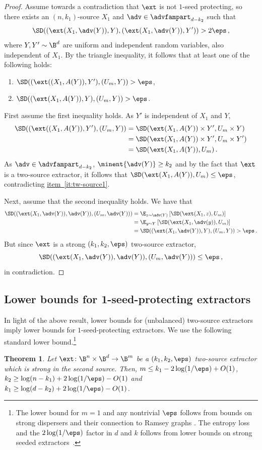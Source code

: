 \documentclass[11pt]{article}
\numberwithin{equation}{section}
\newtheorem{theorem}{Theorem}[section]
\theoremstyle{definition}
\theoremstyle{plain}
\newcommand{\expeqref}[2]{\hyperref[#2]{#1~\eqref{#2}}}
\begin{document}
\begin{proof}
Assume towards a contradiction that $\ext$ is not $1$-seed protecting,
so there exists an $(n,k_1)$-source $X_1$ and $\adv \in \advfampart_{d-k_2}$
such that
	\[
	\SD((\ext(X_1,\adv(Y)), Y), (\ext(X_1,\adv(Y)), Y')) > 2\eps\,,
	\]
where $Y, Y' \sim \B^d$ are uniform and independent random variables, also
independent of $X_1$.
	By the triangle inequality, it follows that at least one of the following holds:
\begin{enumerate}
\item\label{it:tw-source1} $\SD((\ext((X_1,A(Y)), Y'), (U_{m}, Y)) > \eps$,
\item $\SD((\ext(X_1,A(Y)), Y), (U_{m}, Y)) > \eps$.
\end{enumerate}	
First assume the first inequality holds. As $Y'$ is independent of $X_1$ and $Y$,
\begin{align*}
\SD((\ext((X_1,A(Y)), Y'), (U_{m}, Y)) &= 
\SD(\ext(X_1,A(Y)) \times Y', U_m \times Y) \\
&= \SD(\ext(X_1,A(Y)) \times Y', U_m \times Y') \\ &= \SD(\ext(X_1,A(Y)) , U_m)\,.
\end{align*}
As $\adv \in \advfampart_{d-k_2}$, $\minent{\adv(Y)} \ge k_2$ and by the fact that $\ext$ is a two-source extractor, it follows that  $\SD(\ext(X_1,A(Y)) , U_m) \le \eps$,
contradicting \expeqref{item}{it:tw-source1}.
	
Next, assume that the second inequality holds.
We have that 
\begin{align*}
	\SD((\ext(X_1,\adv(Y)), \adv(Y)), (U_{m}, \adv(Y))) &= \E_{z \sim \adv(Y)}\left[ \SD(\ext(X_1,z),U_{m}) \right] \\
	&= \E_{y \sim Y}\left[ \SD(\ext(X_1,\adv(y)),U_{m}) \right] \\
	&=\SD((\ext(X_1,\adv(Y)), Y), (U_{m}, Y)) > \eps\,.
\end{align*}
But since $\ext$ is a strong $(k_1,k_2,\eps)$ two-source extractor,
\[\SD((\ext(X_1,\adv(Y)), \adv(Y)), (U_{m}, \adv(Y))) \le \eps\,,\] in contradiction.
\end{proof}


\subsection{Lower bounds for 1-seed-protecting extractors}

%
In light of the above result, lower bounds for (unbalanced) two-source 
extractors imply lower bounds for $1$-seed-protecting extractors.
We use the following standard lower bound.\footnote{The lower bound for
$m = 1$ and any nontrivial $\eps$ follows from bounds on strong dispersers
and their connection to Ramsey graphs \cite{RTS00,BDT20}. The entropy loss
and the $2\log(1/\eps)$ factor in $d$ and $k$ follows from lower bounds
on strong seeded extractors~\cite{RTS00}.}
\begin{theorem}
Let $\ext \colon \B^{n} \times \B^{d} \rightarrow \B^{m}$ be a 
$(k_1,k_2,\eps)$ two-source extractor which is strong in the second source. Then,
$m \le k_1 - 2\log(1/\eps)+O(1)$, $k_2 \ge \log(n-k_1)+2\log(1/\eps)-O(1)$
and $k_1 \ge \log(d-k_2)+2\log(1/\eps)-O(1)$.
\end{theorem}
\end{document}
